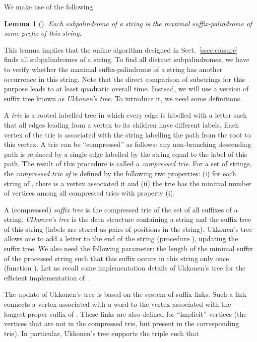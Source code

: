 \documentclass{article}
\theoremstyle{plain}
\newtheorem{lemma}{Lemma}[section]
\theoremstyle{definition}
\begin{document}
We make use of the following

\begin{lemma}[\cite{GPR}]
Each subpalindrome of a string is the maximal suffix-palindrome of some prefix of this string.
\end{lemma}

This lemma implies that the online algorithm designed in Sect.~\ref{ssec:closure} finds all subpalindromes of a string. To find all distinct subpalindromes, we have to verify whether the maximal suffix-palindrome of a string has another occurrence in this string. Note that the direct comparison of substrings for this purpose leads to at least quadratic overall time. Instead, we will use a version of suffix tree known as \emph{Ukkonen's tree}. To introduce it, we need some definitions.

A \emph{trie} is a rooted labelled tree in which every edge is labelled with a letter such that all edges leading from a vertex to its children have different labels. Each vertex of the trie is associated with the string labelling the path from the root to this vertex. A trie can be ``compressed'' as follows: any non-branching descending path is replaced by a single edge labelled by the string equal to the label of this path. The result of this procedure is called a \emph{compressed trie}. For a set  of strings, the \emph{compressed trie of}  is defined by the following two properties: (i) for each string of , there is a vertex associated it and (ii) the trie has the minimal number of vertices among all compressed tries with property (i).

A (compressed) \emph{suffix tree} is the compressed trie of the set of all suffixes of a string. \emph{Ukkonen's tree} is the data structure  containing a string and the suffix tree of this string (labels are stored as pairs of positions in the string). Ukkonen's tree allows one to add a letter to the end of the string (procedure ), updating the suffix tree. We also need the following parameter: the length of the minimal suffix of the processed string such that this suffix occurs in this string only once (function ). Let us recall some implementation details of Ukkonen's tree for the efficient implementation of .

The update of Ukkonen's tree is based on the system of suffix links. Such a link connects a vertex associated with a word  to the vertex associated with the longest proper suffix of . These links are also defined for ``implicit'' vertices (the vertices that are not in the compressed trie, but present in the corresponding trie). In particular, Ukkonen's tree supports the triple  such that
\end{document}
